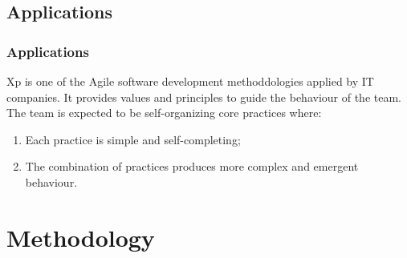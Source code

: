 \documentclass[
	11pt, 
]{beamer}
\begin{document}
\subsection{Applications}

\begin{frame}
	\frametitle{Applications}
		Xp is one of the Agile software development methoddologies applied by IT
companies. It provides values and principles to guide the behaviour of the team.
The team is expected to be self-organizing core practices where:
	\begin{enumerate}
		\item Each practice is simple and self-completing;
		\item The combination of practices produces more complex and emergent behaviour. 
	\end{enumerate}
	\bigskip %

\end{frame}

\section{Methodology}
\end{document}

